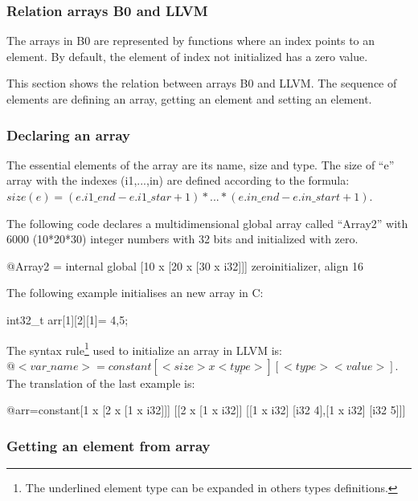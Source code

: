 \subsubsection{Relation arrays B0 and LLVM}

The arrays in B0 are represented by functions where an index points to an 
element. By default, the element of index not initialized has a zero value. 

This section shows the relation between arrays B0 and LLVM. The sequence of
elements are defining an array, getting an element and setting an
element.

\subsubsection{Declaring an array}


The essential elements of the array are its name, size and type. 
The size of ``e'' array with the indexes (i1,...,in) are defined according 
to the formula:\\
 $size(e) = (e.i1\_end - e.i1\_star+1) * ... * (e.in\_end - e.in\_start+1)$.

The following code declares a multidimensional global array called ``Array2'' 
with 6000 (10*20*30) integer numbers with 32 bits and initialized with zero.

\begin{llvmcode}
@Array2 = internal global [10 x [20 x [30 x i32]]] zeroinitializer, align 16
\end{llvmcode}

The following example initialises an new array in C:

\begin{ccode}
int32_t arr[1][2][1]= {{{4},{5}}};
\end{ccode}

The syntax rule\footnote{The underlined element type can be expanded in others types definitions.} used to initialize an array in LLVM is:\\
$@<var\_name> = constant [<size> x \underline{<type>}] [<type> <value>]$.\\
The translation of the last example is:

\begin{llvmcode}
@arr=constant[1 x [2 x [1 x i32]]] [[2 x [1 x i32]] [[1 x i32] [i32 4],[1 x i32] [i32 5]]]
\end{llvmcode}


\subsubsection{Getting an element from array}

